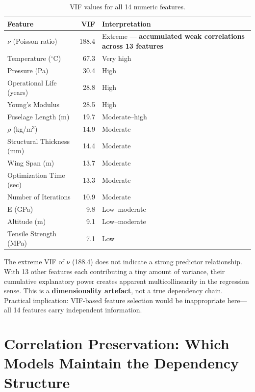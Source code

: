 \documentclass[11pt, a4paper]{report}
\begin{document}
\begin{table}[H]
\centering
\caption{VIF values for all 14 numeric features.}
\label{tab:vif}
\begin{tabular}{lrl}
\toprule
\textbf{Feature} & \textbf{VIF} & \textbf{Interpretation} \\
\midrule
$\nu$ (Poisson ratio)        & 188.4 & Extreme --- \textbf{accumulated weak correlations across 13 features} \\
Temperature ($^\circ$C)      &  67.3 & Very high \\
Pressure (Pa)                &  30.4 & High \\
Operational Life (years)     &  28.8 & High \\
Young's Modulus              &  28.5 & High \\
Fuselage Length (m)          &  19.7 & Moderate--high \\
$\rho$ (kg/m$^3$)            &  14.9 & Moderate \\
Structural Thickness (mm)    &  14.4 & Moderate \\
Wing Span (m)                &  13.7 & Moderate \\
Optimization Time (sec)      &  13.3 & Moderate \\
Number of Iterations         &  10.9 & Moderate \\
E (GPa)                      &   9.8 & Low--moderate \\
Altitude (m)                 &   9.1 & Low--moderate \\
Tensile Strength (MPa)       &   7.1 & Low \\
\bottomrule
\end{tabular}
\end{table}

\begin{findingbox}
The extreme VIF of $\nu$ (188.4) does not indicate a strong predictor relationship. With 13 other features each contributing a tiny amount of variance, their cumulative explanatory power creates apparent multicollinearity in the regression sense. This is a \textbf{dimensionality artefact}, not a true dependency chain. Practical implication: VIF-based feature selection would be inappropriate here---all 14 features carry independent information.
\end{findingbox}


\chapter{Correlation Preservation: Which Models Maintain the Dependency Structure}
\end{document}
